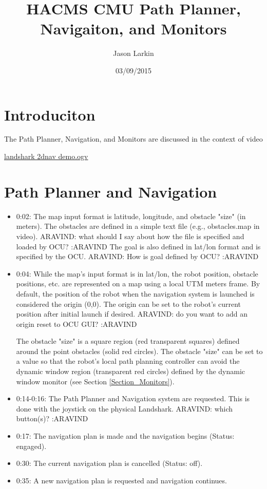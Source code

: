 \documentclass{article}
\title{HACMS CMU Path Planner, Navigaiton, and Monitors}
\author{Jason Larkin}
\date{03/09/2015}
\begin{document}
\maketitle

\section{Introduciton}

The Path Planner, Navigation, and Monitors are discussed in the context of video 

\href{https://www.dropbox.com/s/jlr5wiiuo6to4hc/landshark_2dnav_demo.ogv?dl=0}{landshark 2dnav demo.ogv}

\section{Path Planner and Navigation}
\begin{itemize}
\item 0:02:
The map input format is latitude, longitude, and obstacle "size" (in meters). 
The obstacles are defined in a simple text file (e.g., obstacles.map in video). ARAVIND: what should I say about how the file is specified and loaded by OCU? :ARAVIND The 
goal is also defined in lat/lon format and is specified by the OCU. ARAVIND: How is goal defined by OCU? :ARAVIND
\item 0:04:
While the map's input format is in lat/lon, the robot position, obstacle positions, 
etc. are represented on a map using a local UTM meters frame.  By default, the 
position of the robot when the navigation system is launched is considered 
the origin (0,0). The origin can be set to the robot's current position after initial launch if desired. ARAVIND: do you want to add an origin reset to OCU GUI? :ARAVIND

The obstacle "size" 
is a square region (red transparent squares) defined around the point obstacles 
(solid red circles). The obstacle "size" 
can be set to a value so that the robot's local path planning controller 
can avoid the dynamic window region (transparent red circles) defined by 
the dynamic window monitor (see Section \ref{Section_Monitors}). 
\item 0:14-0:16:
The Path Planner and Navigation system are requested.  This is done with the joystick on the physical Landshark. ARAVIND: which button(s)? :ARAVIND
\item 0:17:
The navigation plan is made and the navigation begins (Status: engaged). 
\item 0:30:
The current navigation plan is cancelled (Status: off).
\item 0:35:
A new navigation plan is requested and navigation continues. 
\end{itemize}
\end{document}
